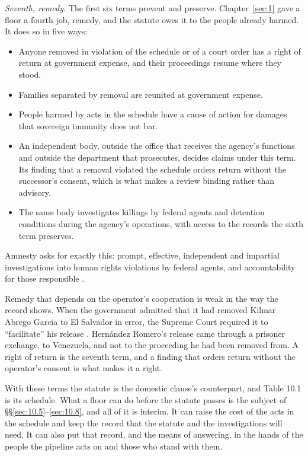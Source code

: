 \emph{Seventh, remedy.} The first six terms prevent and preserve. Chapter~\ref{sec:1} gave a floor a fourth job, remedy, and the statute owes it to the people already harmed. It does so in five ways:

\begin{itemize}
\item Anyone removed in violation of the schedule or of a court order has a right of return at government expense, and their proceedings resume where they stood.
\item Families separated by removal are reunited at government expense.
\item People harmed by acts in the schedule have a cause of action for damages that sovereign immunity does not bar.
\item An independent body, outside the office that receives the agency's functions and outside the department that prosecutes, decides claims under this term. Its finding that a removal violated the schedule orders return without the successor's consent, which is what makes a review binding rather than advisory.
\item The same body investigates killings by federal agents and detention conditions during the agency's operations, with access to the records the sixth term preserves.
\end{itemize}

Amnesty asks for exactly this: prompt, effective, independent and impartial investigations into human rights violations by federal agents, and accountability for those responsible \autocite{Amnesty2026Whistles}.

Remedy that depends on the operator's cooperation is weak in the way the record shows. When the government admitted that it had removed Kilmar Abrego Garcia to El Salvador in error, the Supreme Court required it to “facilitate” his release \autocite{abregogarcia2025}. Hernández Romero's release came through a prisoner exchange, to Venezuela, and not to the proceeding he had been removed from. A right of return is the seventh term, and a finding that orders return without the operator's consent is what makes it a right.

With these terms the statute is the domestic clause's counterpart, and Table 10.1 is its schedule. What a floor can do before the statute passes is the subject of \S\S\ref{sec:10.5}–\ref{sec:10.8}, and all of it is interim. It can raise the cost of the acts in the schedule and keep the record that the statute and the investigations will need. It can also put that record, and the means of answering, in the hands of the people the pipeline acts on and those who stand with them.
